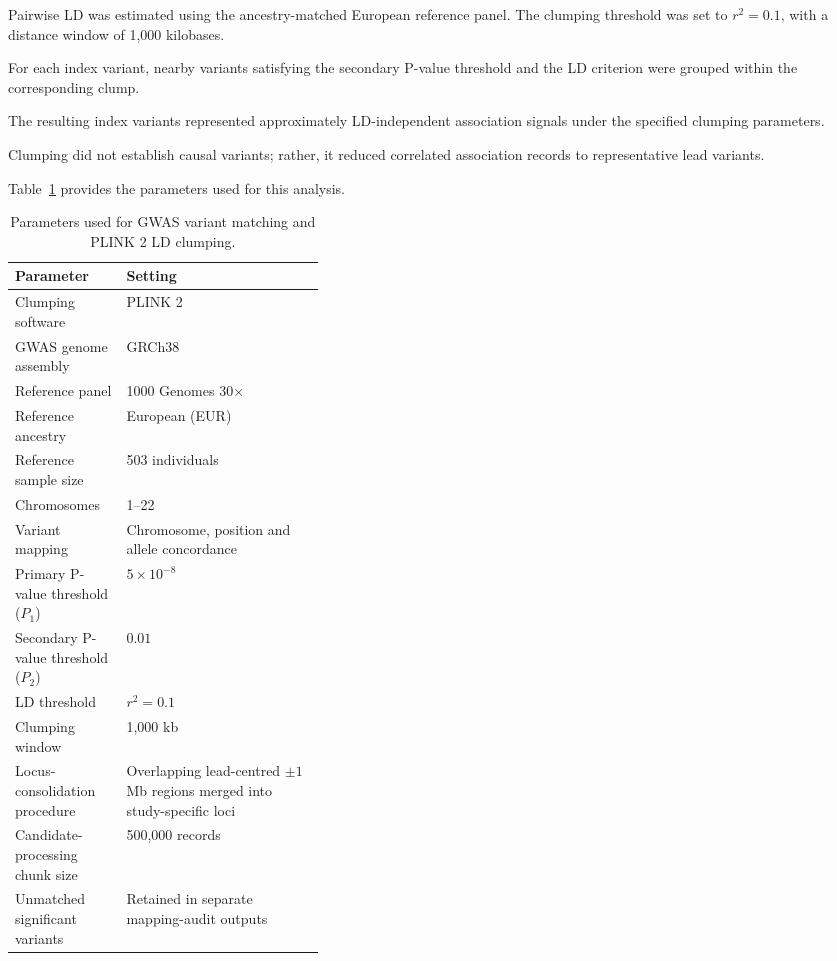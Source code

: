 \documentclass[11pt,a4paper]{article}
\begin{document}
Pairwise LD was estimated using the ancestry-matched
European reference panel. The clumping threshold
was set to $r^2 = 0.1$, with a distance window
of 1,000 kilobases.

For each index variant, nearby variants satisfying
the secondary P-value threshold and the LD
criterion were grouped within the corresponding
clump.

The resulting index variants represented
approximately LD-independent association signals
under the specified clumping parameters.

Clumping did not establish causal variants;
rather, it reduced correlated association
records to representative lead variants.

Table~\ref{tab:clumping_parameters} provides the
parameters used for this analysis.

\begin{table}[htbp]
\centering
\small
\caption{Parameters used for GWAS variant matching
and PLINK 2 LD clumping.}
\label{tab:clumping_parameters}

\begin{tabularx}{\linewidth}{@{}p{0.36\linewidth}X@{}}
\toprule
\textbf{Parameter} & \textbf{Setting} \\
\midrule

Clumping software &
PLINK 2 \\

GWAS genome assembly &
GRCh38 \\

Reference panel &
1000 Genomes 30$\times$ \\

Reference ancestry &
European (EUR) \\

Reference sample size &
503 individuals \\

Chromosomes &
1--22 \\

Variant mapping &
Chromosome, position and allele concordance \\

Primary P-value threshold ($P_1$) &
$5 \times 10^{-8}$ \\

Secondary P-value threshold ($P_2$) &
$0.01$ \\

LD threshold &
$r^2 = 0.1$ \\

Clumping window &
1,000 kb \\

Locus-consolidation procedure &
Overlapping lead-centred $\pm 1$ Mb regions
merged into study-specific loci \\

Candidate-processing chunk size &
500,000 records \\

Unmatched significant variants &
Retained in separate mapping-audit outputs \\

\bottomrule
\end{tabularx}
\end{table}
\end{document}
